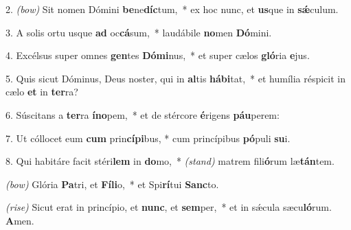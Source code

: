 2. \textit{(bow)} Sit nomen Dómini \textbf{be}ne\textbf{díc}\-tum,~*
	ex hoc nunc, et \textbf{us}que in \textbf{s\'{\ae}}culum.

3. A solis ortu usque \textbf{ad} oc\textbf{cá}sum,~*
	laudábile \textbf{no}men \textbf{Dó}mini.

4. Excélsus super omnes \textbf{gen}tes \textbf{Dó}\textbf{mi}nus,~*
	et super cælos \textbf{gló}ria \textbf{e}jus.

5. Quis sicut Dóminus, Deus noster, qui in \textbf{al}tis \textbf{há}\textbf{bi}tat,~*
	et humília réspicit in cælo \textbf{et} in \textbf{ter}ra?

6. Súscitans a \textbf{ter}ra \textbf{ín}\textbf{o}pem,~*
	et de stércore \textbf{é}rigens \textbf{páu}perem:

7. Ut cóllocet eum \textbf{cum} prin\textbf{cí}\textbf{pi}bus, *
	cum princípibus \textbf{pó}puli \textbf{su}i.

8. Qui habitáre facit stéri\textbf{lem} in \textbf{do}mo,~* {\color{red}\textit{(stand)}}
	matrem fili\textbf{ó}rum læ\textbf{tán}tem.

{\color{red}\textit{(bow)}} Glória \textbf{Pa}tri, et \textbf{Fí}\textbf{li}o,~*
	et Spi\textbf{rí}tui \textbf{Sanc}to.
	
{\color{red}\textit{(rise)}} Sicut erat in princípio, et \textbf{nunc}, et \textbf{sem}per,~*
	et in s\'{\ae}cula sæcu\textbf{ló}rum. \textbf{A}men.